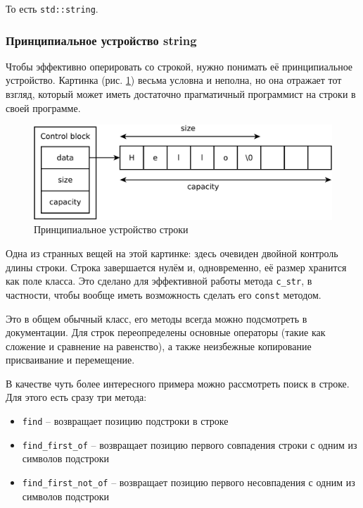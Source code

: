 \documentclass[a4paper,12pt,oneside]{article}
\begin{document}
То есть \lstinline!std::string!.

\subsubsection{Принципиальное устройство string}\label{subsub:strings}

Чтобы эффективно оперировать со строкой, нужно понимать её принципиальное устройство. Картинка (рис. \ref{fig:string-principal}) весьма условна и неполна, но она отражает тот взгляд, который может иметь достаточно прагматичный программист на строки в своей программе.

\begin{figure}[ht]
\centering
\includegraphics[width=1.0\textwidth]{illustrations/string-principal-crop.pdf}
\caption{Принципиальное устройство строки}
\label{fig:string-principal}
\end{figure}

Одна из странных вещей на этой картинке: здесь очевиден двойной контроль длины строки. Строка завершается нулём и, одновременно, её размер хранится как поле класса. Это сделано для эффективной работы метода \lstinline!c_str!, в частности, чтобы вообще иметь возможность сделать его \lstinline!const! методом.

Это в общем обычный класс, его методы всегда можно подсмотреть в документации. Для строк переопределены основные операторы (такие как сложение и сравнение на равенство), а также неизбежные копирование присваивание и перемещение.

В качестве чуть более интересного примера можно рассмотреть поиск в строке. Для этого есть сразу три метода:

\begin{itemize}
\item \lstinline!find! -- возвращает позицию подстроки в строке
\item \lstinline!find_first_of! -- возвращает позицию первого совпадения строки с одним из символов подстроки
\item \lstinline!find_first_not_of! -- возвращает позицию первого несовпадения с одним из символов подстроки
\end{itemize}
\end{document}
